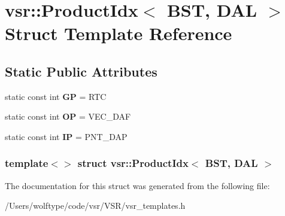 \hypertarget{structvsr_1_1_product_idx_3_01_b_s_t_00_01_d_a_l_01_4}{\section{vsr\-:\-:Product\-Idx$<$ B\-S\-T, D\-A\-L $>$ Struct Template Reference}
\label{structvsr_1_1_product_idx_3_01_b_s_t_00_01_d_a_l_01_4}
}
\subsection*{Static Public Attributes}
\begin{DoxyCompactItemize}
\item 
\hypertarget{structvsr_1_1_product_idx_3_01_b_s_t_00_01_d_a_l_01_4_a9f961b09edcf60716027bdf3261aaf43}{static const int {\bfseries G\-P} = R\-T\-C}\label{structvsr_1_1_product_idx_3_01_b_s_t_00_01_d_a_l_01_4_a9f961b09edcf60716027bdf3261aaf43}

\item 
\hypertarget{structvsr_1_1_product_idx_3_01_b_s_t_00_01_d_a_l_01_4_a982457c92869d18ee09089a8a985c765}{static const int {\bfseries O\-P} = V\-E\-C\-\_\-\-D\-A\-F}\label{structvsr_1_1_product_idx_3_01_b_s_t_00_01_d_a_l_01_4_a982457c92869d18ee09089a8a985c765}

\item 
\hypertarget{structvsr_1_1_product_idx_3_01_b_s_t_00_01_d_a_l_01_4_a5df110d9675499bf3d9adce05fe77f4f}{static const int {\bfseries I\-P} = P\-N\-T\-\_\-\-D\-A\-P}\label{structvsr_1_1_product_idx_3_01_b_s_t_00_01_d_a_l_01_4_a5df110d9675499bf3d9adce05fe77f4f}

\end{DoxyCompactItemize}
\subsubsection*{template$<$$>$ struct vsr\-::\-Product\-Idx$<$ B\-S\-T, D\-A\-L $>$}



The documentation for this struct was generated from the following file\-:\begin{DoxyCompactItemize}
\item 
/\-Users/wolftype/code/vsr/\-V\-S\-R/vsr\-\_\-templates.\-h\end{DoxyCompactItemize}
